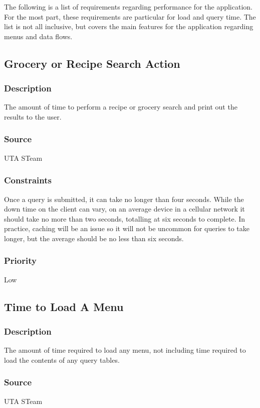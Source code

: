 The following is a list of requirements regarding performance for the application.  For the most part, these requirements are particular for load and query time.  The list is not all inclusive, but covers the main features for the application regarding menus and data flows.
\subsection{Grocery or Recipe Search Action}
\subsubsection{Description}
The amount of time to perform a recipe or grocery search and print out the results to the user.
\subsubsection{Source}
UTA STeam
\subsubsection{Constraints}
Once a query is submitted, it can take no longer than four seconds.  
While the down time on the client can vary, on an average device in a cellular network it should take no more than two seconds, totalling at six seconds to complete.
In practice, caching will be an issue so it will not be uncommon for queries to take longer, but the average should be no less than six seconds.
\subsubsection{Priority}
Low

\subsection{Time to Load A Menu}
\subsubsection{Description}
The amount of time required to load any menu, not including time required to load the contents of any query tables.
\subsubsection{Source}
UTA STeam
